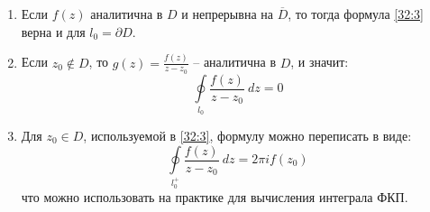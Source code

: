 \documentclass[../../main.tex]{subfiles}
\begin{document}
\begin{remarks}
	\;
	
	\begin{enumerate}
		\item Если $f(z)$ аналитична в $D$ и непрерывна на $\overline{D}$, то тогда 
		формула 
		\eqref{32:3} верна и для $l_0 = \partial D$.
		\item Если $z_0 \notin D$, то $g(z) = \frac{f(z)}{z-z_0}$ \--- аналитична в 
		$D$, и значит:
		\[  \oint \limits_{l_0} \frac{f(z)}{z-z_0} \ dz = 0  \]
		\item Для $z_0 \in D$, используемой в \eqref{32:3}, формулу можно переписать 
		в виде:
		\begin{equation}
		\label{32:5}
		\oint \limits_{l_0^+} \frac{f(z)}{z-z_0} \ dz = 2 \pi i f(z_0)
		\end{equation}
		что можно использовать на практике для вычисления интеграла ФКП.
	\end{enumerate}
\end{remarks}	
\end{document}
